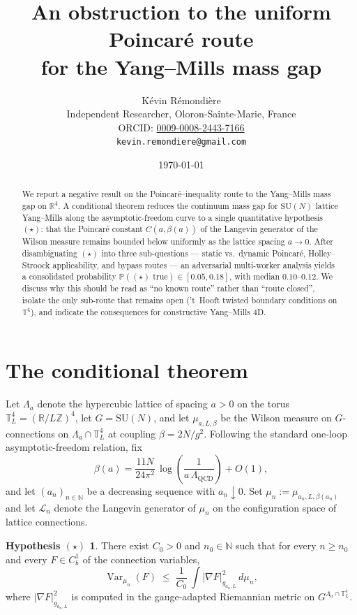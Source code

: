 \documentclass[11pt,a4paper]{amsart}
\title{An obstruction to the uniform Poincar\'e route\\for the Yang--Mills mass gap}
\author{K\'evin R\'emondi\`ere\\
\small Independent Researcher, Oloron-Sainte-Marie, France\\
\small ORCID: \href{https://orcid.org/0009-0008-2443-7166}{0009-0008-2443-7166}\\
\small \texttt{kevin.remondiere@gmail.com}}
\date{\today}
\theoremstyle{definition}
\newtheorem*{hypothesis}{Hypothesis $(\star)$}
\theoremstyle{remark}
\DeclareMathOperator{\Var}{Var}
\begin{document}
\begin{abstract}
We report a negative result on the Poincar\'e--inequality route to the Yang--Mills mass gap on $\mathbb{R}^4$. A conditional theorem reduces the continuum mass gap for $\mathrm{SU}(N)$ lattice Yang--Mills along the asymptotic-freedom curve to a single quantitative hypothesis $(\star)$: that the Poincar\'e constant $C(a,\beta(a))$ of the Langevin generator of the Wilson measure remains bounded below uniformly as the lattice spacing $a\to 0$. After disambiguating $(\star)$ into three sub-questions --- static vs.\ dynamic Poincar\'e, Holley--Stroock applicability, and bypass routes --- an adversarial multi-worker analysis yields a consolidated probability $\mathbb{P}((\star)\text{ true})\in[0.05,0.18]$, with median $0.10$--$0.12$. We discuss why this should be read as ``no known route'' rather than ``route closed'', isolate the only sub-route that remains open ('t~Hooft twisted boundary conditions on $\mathbb{T}^4$), and indicate the consequences for constructive Yang--Mills 4D.
\end{abstract}

\maketitle

\section{The conditional theorem}\label{sec:thm}

Let $\Lambda_a$ denote the hypercubic lattice of spacing $a>0$ on the torus $\mathbb{T}^4_L = (\mathbb{R}/L\mathbb{Z})^4$, let $G=\mathrm{SU}(N)$, and let $\mu_{a,L,\beta}$ be the Wilson measure on $G$-connections on $\Lambda_a\cap \mathbb{T}^4_L$ at coupling $\beta = 2N/g^2$. Following the standard one-loop asymptotic-freedom relation, fix
\begin{equation}\label{eq:af}
\beta(a) = \frac{11N}{24\pi^2}\,\log\!\left(\frac{1}{a\,\Lambda_{\mathrm{QCD}}}\right) + O(1),
\end{equation}
and let $(a_n)_{n\in\mathbb{N}}$ be a decreasing sequence with $a_n\downarrow 0$. Set $\mu_n := \mu_{a_n,L,\beta(a_n)}$ and let $\mathcal{L}_n$ denote the Langevin generator of $\mu_n$ on the configuration space of lattice connections.

\begin{hypothesis}
There exist $C_0>0$ and $n_0\in\mathbb{N}$ such that for every $n\ge n_0$ and every $F\in C^1_b$ of the connection variables,
\begin{equation}\label{eq:poincare}
\Var_{\mu_n}(F)\;\le\;\frac{1}{C_0}\,\int |\nabla F|^2_{g_{a_n,L}}\,d\mu_n,
\end{equation}
where $|\nabla F|^2_{g_{a_n,L}}$ is computed in the gauge-adapted Riemannian metric on $G^{\Lambda_a\cap\mathbb{T}^4_L}$.
\end{hypothesis}
\end{document}
